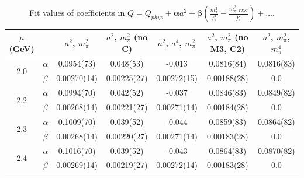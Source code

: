\documentclass[12pt]{extarticle}
\begin{document}
\begin{table}[h!]
\begin{center}
\begin{tabular}{|c c|c|c|c|c|c|}
\hline
$\mu$ (GeV) &  & $a^2$, $m_\pi^2$& $a^2$, $m_\pi^2$ (no C)& $a^2$, $a^4$, $m_\pi^2$& $a^2$, $m_\pi^2$ (no M3, C2)& $a^2$, $m_\pi^2$, $m_\pi^4$\\
\hline
\multirow{2}{0.5in}{2.0} & $\alpha$ & 0.0954(73)& 0.048(53)& -0.013& 0.0816(84)& 0.0816(83)\\
 & $\beta$ & 0.00270(14)& 0.00225(27)& 0.00272(15)& 0.00188(28)& 0.0\\
\hline
\multirow{2}{0.5in}{2.2} & $\alpha$ & 0.0994(70)& 0.042(52)& -0.037& 0.0846(83)& 0.0849(82)\\
 & $\beta$ & 0.00268(14)& 0.00221(27)& 0.00271(14)& 0.00184(28)& 0.0\\
\hline
\multirow{2}{0.5in}{2.3} & $\alpha$ & 0.1009(70)& 0.039(52)& -0.044& 0.0859(83)& 0.0864(82)\\
 & $\beta$ & 0.00268(14)& 0.00220(27)& 0.00271(14)& 0.00183(28)& 0.0\\
\hline
\multirow{2}{0.5in}{2.4} & $\alpha$ & 0.1016(70)& 0.039(52)& -0.043& 0.0864(83)& 0.0870(82)\\
 & $\beta$ & 0.00269(14)& 0.00219(27)& 0.00272(14)& 0.00183(28)& 0.0\\
\hline
\end{tabular}
\caption{Fit values of coefficients in $Q = Q_{phys} + \mathbf{\alpha} a^2 + \mathbf{\beta}\left(\frac{m_\pi^2}{f_\pi^2}-\frac{m_{\pi,PDG}^2}{f_\pi^2}\right) + \ldots$.}
\end{center}
\end{table}




















\clearpage
\end{document}
